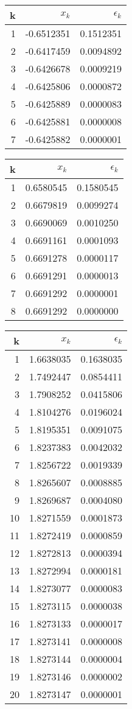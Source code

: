\documentclass[]{article}
\begin{document}
\begin{tabular}[t]{ |r|r r| }
\hline
k & $x_k$ & $\epsilon_k$\\
\hline
1 & -0.6512351 & 0.1512351 \\
2 & -0.6417459 & 0.0094892 \\
3 & -0.6426678 & 0.0009219 \\
4 & -0.6425806 & 0.0000872 \\
5 & -0.6425889 & 0.0000083 \\
6 & -0.6425881 & 0.0000008 \\
7 & -0.6425882 & 0.0000001 \\
\hline
\end{tabular}
\begin{tabular}[t]{ |r|r r| }
\hline
k & $x_k$ & $\epsilon_k$\\
\hline
1 & 0.6580545 & 0.1580545 \\
2 & 0.6679819 & 0.0099274 \\
3 & 0.6690069 & 0.0010250 \\
4 & 0.6691161 & 0.0001093 \\
5 & 0.6691278 & 0.0000117 \\
6 & 0.6691291 & 0.0000013 \\
7 & 0.6691292 & 0.0000001 \\
8 & 0.6691292 & 0.0000000 \\
\hline
\end{tabular}
\begin{tabular}[t]{ |r|r r| }
\hline
k & $x_k$ & $\epsilon_k$\\
\hline
1 & 1.6638035 & 0.1638035 \\
2 & 1.7492447 & 0.0854411 \\
3 & 1.7908252 & 0.0415806 \\
4 & 1.8104276 & 0.0196024 \\
5 & 1.8195351 & 0.0091075 \\
6 & 1.8237383 & 0.0042032 \\
7 & 1.8256722 & 0.0019339 \\
8 & 1.8265607 & 0.0008885 \\
9 & 1.8269687 & 0.0004080 \\
10 & 1.8271559 & 0.0001873 \\
11 & 1.8272419 & 0.0000859 \\
12 & 1.8272813 & 0.0000394 \\
13 & 1.8272994 & 0.0000181 \\
14 & 1.8273077 & 0.0000083 \\
15 & 1.8273115 & 0.0000038 \\
16 & 1.8273133 & 0.0000017 \\
17 & 1.8273141 & 0.0000008 \\
18 & 1.8273144 & 0.0000004 \\
19 & 1.8273146 & 0.0000002 \\
20 & 1.8273147 & 0.0000001 \\
\hline
\end{tabular}
\end{document}
